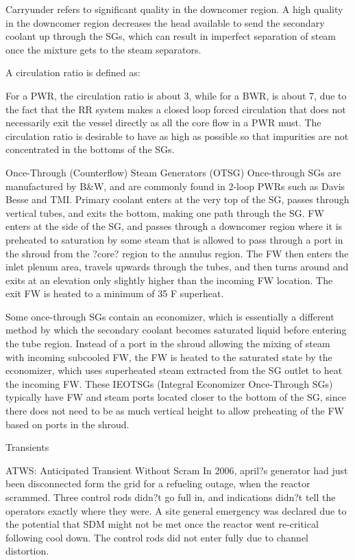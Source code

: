 \documentclass[10pt]{article}
\begin{document}
Carryunder refers to significant quality in the downcomer region. A high quality in the downcomer region decreases the head available to send the secondary coolant up through the SGs, which can result in imperfect separation of steam once the mixture gets to the steam separators. 

A circulation ratio is defined as:


For a PWR, the circulation ratio is about 3, while for a BWR, is about 7, due to the fact that the RR system makes a closed loop forced circulation that does not necessarily exit the vessel directly as all the core flow in a PWR must. The circulation ratio is desirable to have as high as possible so that impurities are not concentrated in the bottoms of the SGs. 

Once-Through (Counterflow) Steam Generators (OTSG)
Once-through SGs are manufactured by B\&W, and are commonly found in 2-loop PWRs such as Davis Besse and TMI. Primary coolant enters at the very top of the SG, passes through vertical tubes, and exits the bottom, making one path through the SG. FW enters at the side of the SG, and passes through a downcomer region where it is preheated to saturation by some steam that is allowed to pass through a port in the shroud from the ?core? region to the annulus region. The FW then enters the inlet plenum area, travels upwards through the tubes, and then turns around and exits at an elevation only slightly higher than the incoming FW location. The exit FW is heated to a minimum of 35 F superheat. 

Some once-through SGs contain an economizer, which is essentially a different method by which the secondary coolant becomes saturated liquid before entering the tube region. Instead of a port in the shroud allowing the mixing of steam with incoming subcooled FW, the FW is heated to the saturated state by the economizer, which uses superheated steam extracted from the SG outlet to heat the incoming FW. These IEOTSGs (Integral Economizer Once-Through SGs) typically have FW and steam ports located closer to the bottom of the SG, since there does not need to be as much vertical height to allow preheating of the FW based on ports in the shroud. 


Transients

ATWS: Anticipated Transient Without Scram
In 2006, april?s generator had just been disconnected form the grid for a refueling outage, when the reactor scrammed. Three control rods didn?t go full in, and indications didn?t tell the operators exactly where they were. A site general emergency was declared due to the potential that SDM might not be met once the reactor went re-critical following cool down. The control rods did not enter fully due to channel distortion. 
\end{document}
